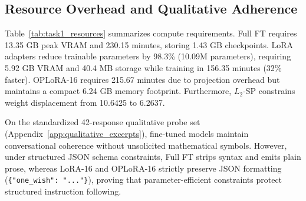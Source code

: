 \documentclass{article}
\begin{document}
\begin{table}[!htbp]
\centering
\caption{Computational resource allocation and parameter displacement across adaptation regimes. Full-model displacement denotes the total Frobenius distance $\| \theta - \theta_0 \|_F$.}
\label{tab:task1_resources}
\end{table}

\subsection{Resource Overhead and Qualitative Adherence}
Table~\ref{tab:task1_resources} summarizes compute requirements. Full FT requires 13.35 GB peak VRAM and 230.15 minutes, storing 1.43 GB checkpoints. LoRA adapters reduce trainable parameters by 98.3\% (10.09M parameters), requiring 5.92 GB VRAM and 40.4 MB storage while training in 156.35 minutes (32\% faster). OPLoRA-16 requires 215.67 minutes due to projection overhead but maintains a compact 6.24 GB memory footprint. Furthermore, $L_2$-SP constrains weight displacement from 10.6425 to 6.2637.

On the standardized 42-response qualitative probe set (Appendix~\ref{app:qualitative_excerpts}), fine-tuned models maintain conversational coherence without unsolicited mathematical symbols. However, under structured JSON schema constraints, Full FT strips syntax and emits plain prose, whereas LoRA-16 and OPLoRA-16 strictly preserve JSON formatting (\texttt{\{"one\_wish": "..."\}}), proving that parameter-efficient constraints protect structured instruction following.

\FloatBarrier
\end{document}
